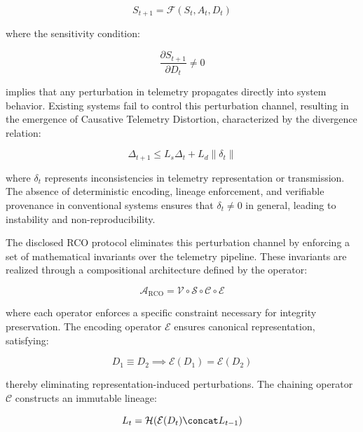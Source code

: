 \begin{equation}
S_{t+1} = \mathcal{F}(S_t, A_t, D_t)
\end{equation}

where the sensitivity condition:

\begin{equation}
\frac{\partial S_{t+1}}{\partial D_t} \neq 0
\end{equation}

implies that any perturbation in telemetry propagates directly into system behavior. Existing systems fail to control this perturbation channel, resulting in the emergence of Causative Telemetry Distortion, characterized by the divergence relation:

\begin{equation}
\Delta_{t+1} \leq L_s \Delta_t + L_d \|\delta_t\|
\end{equation}

where $\delta_t$ represents inconsistencies in telemetry representation or transmission. The absence of deterministic encoding, lineage enforcement, and verifiable provenance in conventional systems ensures that $\delta_t \neq 0$ in general, leading to instability and non-reproducibility.

The disclosed RCO protocol eliminates this perturbation channel by enforcing a set of mathematical invariants over the telemetry pipeline. These invariants are realized through a compositional architecture defined by the operator:

\begin{equation}
\mathcal{A}_{\text{RCO}} = \mathcal{V} \circ \mathcal{S} \circ \mathcal{C} \circ \mathcal{E}
\end{equation}

where each operator enforces a specific constraint necessary for integrity preservation. The encoding operator $\mathcal{E}$ ensures canonical representation, satisfying:

\begin{equation}
D_1 \equiv D_2 \implies \mathcal{E}(D_1) = \mathcal{E}(D_2)
\end{equation}

thereby eliminating representation-induced perturbations. The chaining operator $\mathcal{C}$ constructs an immutable lineage:

\begin{equation}
L_t = \mathcal{H}(\mathcal{E}(D_t) \concat L_{t-1})
\end{equation}

